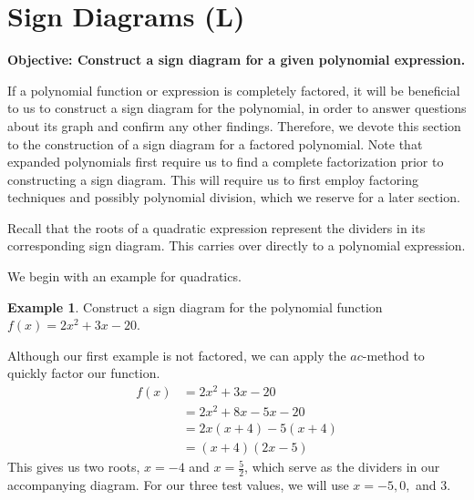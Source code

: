 \documentclass[12pt]{book}
\theoremstyle{definition}
\newtheorem{example}{Example}
\begin{document}
\section{Sign Diagrams (L)}
{\bf Objective: Construct a sign diagram for a given polynomial expression.}\par
If a polynomial function or expression is completely factored, it will be beneficial to us to construct a sign diagram for the polynomial, in order to answer questions about its graph and confirm any other findings.  Therefore, we devote this section to the construction of a sign diagram for a factored polynomial.  Note that expanded polynomials first require us to find a complete factorization prior to constructing a sign diagram.  This will require us to first employ factoring techniques and possibly polynomial division, which we reserve for a later section.
\par
Recall that the roots of a quadratic expression represent the dividers in its corresponding sign diagram.  This carries over directly to a polynomial expression.
\par
We begin with an example for quadratics.
\begin{example}\label{sign_diag_poly_0}
Construct a sign diagram for the polynomial function $f(x)=2x^2+3x-20$.
\par
Although our first example is not factored, we can apply the $ac$-method to quickly factor our function.
\begin{equation*}
\begin{split}
f(x) & = 2x^2+3x-20\\
& = 2x^2+8x-5x-20\\
& = 2x(x+4)-5(x+4)\\
& = (x+4)(2x-5)
\end{split}
\end{equation*}
This gives us two roots, $x=-4$ and $x=\frac{5}{2}$, which serve as the dividers in our accompanying diagram.  For our three test values, we will use $x=-5, 0,$ and $3$.
\begin{center}
\end{center}
\end{example}
\end{document}

